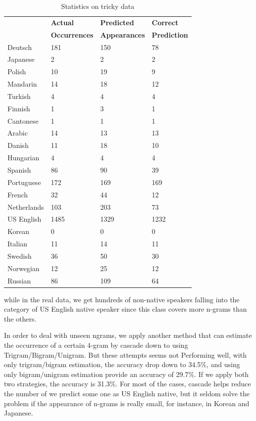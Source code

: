 \documentclass[11pt]{article}
\begin{document}
\begin{table}[h]
\begin{center}
\small\addtolength{\tabcolsep}{-5pt}
\begin{tabular}{|l|l|l|l|}
\hline & \bf Actual & \bf Predicted & \bf Correct \\ 
& \bf Occurrences & \bf Appearances & \bf Prediction \\ \hline
Deutsch & 181 & 150 & 78 \\
Japanese & 2 & 2 & 2 \\
Polish & 10 & 19 & 9 \\
Mandarin & 14 & 18 & 12 \\
Turkish & 4 & 4 & 4 \\
Finnish & 1 & 3 & 1 \\
Cantonese & 1 & 1 & 1 \\
Arabic & 14 & 13 & 13 \\
Danish & 11 & 18 & 10 \\
Hungarian & 4 & 4 & 4 \\
Spanish & 86 & 90 & 39 \\
Portuguese & 172 & 169 & 169 \\
French & 32 & 44 & 12 \\
Netherlands & 103 & 203 & 73 \\
US English & 1485 & 1329 & 1232 \\
Korean & 0 & 0 & 0 \\
Italian & 11 & 14 & 11\\
Swedish & 36 & 50 & 30 \\
Norwegian & 12 & 25 & 12 \\
Russian & 86 & 109 & 64 \\
\hline
\end{tabular}
\end{center}
\caption{\label{font-table} Statistics on tricky data }
\end{table}


while in the real data, we get hundreds of non-native speakers falling into the category of US English native speaker since this class covers more n-grams than the others.

In order to deal with unseen ngrams, we apply another method that can estimate the occurrence of a certain 4-gram by cascade down to using Trigram/Bigram/Unigram. But these attempts seems not Performing well, with only trigram/bigram estimation, the accuracy drop down to 34.5\%, and using only bigram/unigram estimation provide an accuracy of 29.7\%. If we apply both two strategies, the accuracy is 31.3\%. For most of the cases, cascade helps reduce the number of we predict some one as US English native, but it seldom solve the problem if the appearance of n-grams is really small, for instance, in Korean and Japanese.  
\end{document}
